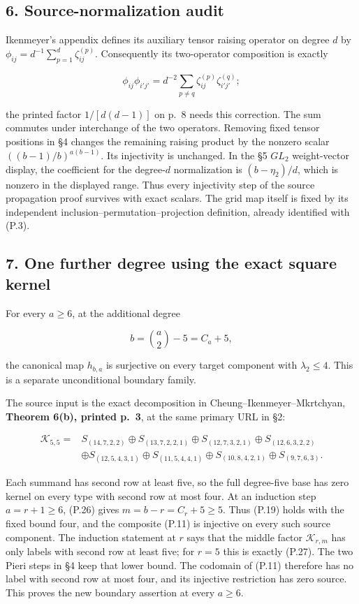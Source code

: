 \documentclass[
  10pt,
]{article}
\begin{document}
\subsection{6. Source-normalization
audit}\label{source-normalization-audit}

Ikenmeyer's appendix defines its auxiliary tensor raising operator on
degree \(d\) by \(\phi_{ij}=d^{-1}\sum_{p=1}^{d}\zeta_{ij}^{(p)}\).
Consequently its two-operator composition is exactly

\[
\phi_{ij}\phi_{i'j'}
=d^{-2}\sum_{p\ne q}\zeta_{ij}^{(p)}\zeta_{i'j'}^{(q)};
\tag{P.25}
\]

the printed factor \(1/[d(d-1)]\) on p.~8 needs this correction. The sum
commutes under interchange of the two operators. Removing fixed tensor
positions in §4 changes the remaining raising product by the nonzero
scalar \(((b-1)/b)^{a(b-1)}\). Its injectivity is unchanged. In the §5
\(GL_2\) weight-vector display, the coefficient for the degree-\(d\)
normalization is \((b-\eta_2)/d\), which is nonzero in the displayed
range. Thus every injectivity step of the source propagation proof
survives with exact scalars. The grid map itself is fixed by its
independent inclusion--permutation--projection definition, already
identified with (P.3).

\subsection{7. One further degree using the exact square
kernel}\label{one-further-degree-using-the-exact-square-kernel}

For every \(a\ge6\), at the additional degree

\[
b=\binom a2-5=C_a+5,
\tag{P.26}
\]

the canonical map \(h_{b,a}\) is surjective on every target component
with \(\lambda_2\le4\). This is a separate unconditional boundary
family.

The source input is the exact decomposition in
Cheung--Ikenmeyer--Mkrtchyan, \textbf{Theorem 6(b), printed p.~3}, at
the same primary URL in §2:

\[
\begin{aligned}
\mathcal K_{5,5}={}&
S_{(14,7,2,2)}\oplus S_{(13,7,2,2,1)}
\oplus S_{(12,7,3,2,1)}\oplus S_{(12,6,3,2,2)}\\
&\oplus S_{(12,5,4,3,1)}\oplus S_{(11,5,4,4,1)}
\oplus S_{(10,8,4,2,1)}\oplus S_{(9,7,6,3)}.
\end{aligned}
\tag{P.27}
\]

Each summand has second row at least five, so the full degree-five base
has zero kernel on every type with second row at most four. At an
induction step \(a=r+1\ge6\), (P.26) gives \(m=b-r=C_r+5\ge5\). Thus
(P.19) holds with the fixed bound four, and the composite (P.11) is
injective on every such source component. The induction statement at
\(r\) says that the middle factor \(\mathcal K_{r,m}\) has only labels
with second row at least five; for \(r=5\) this is exactly (P.27). The
two Pieri steps in §4 keep that lower bound. The codomain of (P.11)
therefore has no label with second row at most four, and its injective
restriction has zero source. This proves the new boundary assertion at
every \(a\ge6\).
\end{document}
